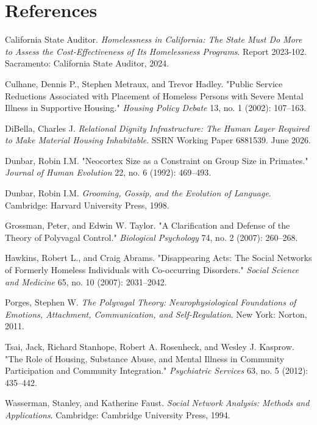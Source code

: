 \documentclass[12pt, letterpaper]{article}
\begin{document}
\newpage


\clearpage
{}
\section*{References}

California State Auditor. \textit{Homelessness in California: The State Must Do More to Assess the Cost-Effectiveness of Its Homelessness Programs}. Report 2023-102. Sacramento: California State Auditor, 2024.

Culhane, Dennis P., Stephen Metraux, and Trevor Hadley. "Public Service Reductions Associated with Placement of Homeless Persons with Severe Mental Illness in Supportive Housing." \textit{Housing Policy Debate} 13, no. 1 (2002): 107–163.

DiBella, Charles J. \textit{Relational Dignity Infrastructure: The Human Layer Required to Make Material Housing Inhabitable}. SSRN Working Paper 6881539. June 2026.

Dunbar, Robin I.M. "Neocortex Size as a Constraint on Group Size in Primates." \textit{Journal of Human Evolution} 22, no. 6 (1992): 469--493.

Dunbar, Robin I.M. \textit{Grooming, Gossip, and the Evolution of Language}. Cambridge: Harvard University Press, 1998.

Grossman, Peter, and Edwin W. Taylor. "A Clarification and Defense of the Theory of Polyvagal Control." \textit{Biological Psychology} 74, no. 2 (2007): 260–268.

Hawkins, Robert L., and Craig Abrams. "Disappearing Acts: The Social Networks of Formerly Homeless Individuals with Co-occurring Disorders." \textit{Social Science and Medicine} 65, no. 10 (2007): 2031–2042.

Porges, Stephen W. \textit{The Polyvagal Theory: Neurophysiological Foundations of Emotions, Attachment, Communication, and Self-Regulation}. New York: Norton, 2011.

Tsai, Jack, Richard Stanhope, Robert A. Rosenheck, and Wesley J. Kasprow. "The Role of Housing, Substance Abuse, and Mental Illness in Community Participation and Community Integration." \textit{Psychiatric Services} 63, no. 5 (2012): 435–442.

Wasserman, Stanley, and Katherine Faust. \textit{Social Network Analysis: Methods and Applications}. Cambridge: Cambridge University Press, 1994.
\end{document}

